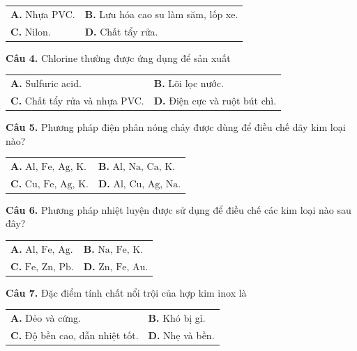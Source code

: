 \documentclass{article}
\begin{document}
\begin{tabularx}{\linewidth}{@{}X X@{}}
\textbf{A.} Nhựa PVC. & \textbf{B.} Lưu hóa cao su làm săm, lốp xe.\\[8pt]
\textbf{C.} Nilon. & \textbf{D.} Chất tẩy rửa.
\end{tabularx}

\vspace*{\fill}

\textbf{Câu 4.} Chlorine thường được ứng dụng để sản xuất
\vspace{6pt}

\begin{tabularx}{\linewidth}{@{}X X@{}}
\textbf{A.} Sulfuric acid. & \textbf{B.} Lõi lọc nước.\\[8pt]
\textbf{C.} Chất tẩy rửa và nhựa PVC. & \textbf{D.} Điện cực và ruột bút chì.
\end{tabularx}
\vspace*{\fill}
\newpage

\fontsize{28}{36}\selectfont
\textbf{Câu 5.} Phương pháp điện phân nóng chảy được dùng để điều chế dãy kim loại nào?
\vspace{6pt}

\begin{tabularx}{\linewidth}{@{}X X@{}}
\textbf{A.} $\text{Al, Fe, Ag, K}$. & \textbf{B.} $\text{Al, Na, Ca, K}$.\\[8pt]
\textbf{C.} $\text{Cu, Fe, Ag, K}$. & \textbf{D.} $\text{Al, Cu, Ag, Na}$.
\end{tabularx}

\vspace*{\fill}

\textbf{Câu 6.} Phương pháp nhiệt luyện được sử dụng để điều chế các kim loại nào sau đây?
\vspace{6pt}

\begin{tabularx}{\linewidth}{@{}X X@{}}
\textbf{A.} $\text{Al, Fe, Ag}$. & \textbf{B.} $\text{Na, Fe, K}$.\\[8pt]
\textbf{C.} $\text{Fe, Zn, Pb}$. & \textbf{D.} $\text{Zn, Fe, Au}$.
\end{tabularx}
\vspace*{\fill}
\newpage

\fontsize{28}{36}\selectfont
\textbf{Câu 7.} Đặc điểm tính chất nổi trội của hợp kim inox là
\vspace{6pt}

\begin{tabularx}{\linewidth}{@{}X X@{}}
\textbf{A.} Dẻo và cứng. & \textbf{B.} Khó bị gỉ.\\[8pt]
\textbf{C.} Độ bền cao, dẫn nhiệt tốt. & \textbf{D.} Nhẹ và bền.
\end{tabularx}
\end{document}
